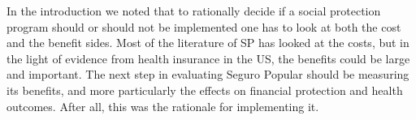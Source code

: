 \documentclass[oneside,11pt]{article}
\begin{document}
In the introduction we noted that to rationally decide if a social protection program should or should not be implemented one has to look at both the cost and the benefit sides. Most of the literature of SP has looked at the costs, but in the light of evidence from health insurance in the US, the benefits could be large and important. The next step in evaluating Seguro Popular should be measuring its benefits, and more particularly the effects on financial protection and health outcomes. After all, this was the rationale for implementing it.
\newpage




\clearpage

%
%



\nocite{GonzalezPier, GonzalezBarraza, Knaul}




\newpage
\singlespacing


    



\newpage

\end{document}
